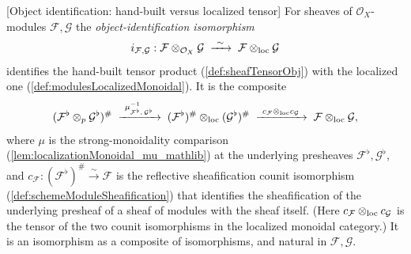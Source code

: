\begin{definition}



[Object identification: hand-built versus localized tensor]
  \label{def:tensorObjLocalizedIso}
  For sheaves of \(\mathcal{O}_X\)-modules \(\mathcal{F}, \mathcal{G}\) the
  \emph{object-identification isomorphism}
  \[
    i_{\mathcal{F},\mathcal{G}} :
      \mathcal{F} \otimes_{\mathcal{O}_X} \mathcal{G}
      \;\xrightarrow{\ \sim\ }\;
      \mathcal{F} \mathbin{\otimes_{\mathrm{loc}}} \mathcal{G}
  \]
  identifies the hand-built tensor product (\cref{def:sheafTensorObj}) with the
  localized one (\cref{def:modulesLocalizedMonoidal}). It is the composite
  \[
    (\mathcal{F}^{\flat} \otimes_p \mathcal{G}^{\flat})^{\#}
      \;\xrightarrow{\ \mu_{\mathcal{F}^{\flat},\,\mathcal{G}^{\flat}}^{-1}\ }\;
      (\mathcal{F}^{\flat})^{\#} \lotimes (\mathcal{G}^{\flat})^{\#}
      \;\xrightarrow{\ c_{\mathcal{F}} \lotimes c_{\mathcal{G}}\ }\;
      \mathcal{F} \lotimes \mathcal{G},
  \]
  where \(\mu\) is the strong-monoidality comparison
  (\cref{lem:localizationMonoidal_mu_mathlib}) at the underlying presheaves
  \(\mathcal{F}^{\flat}, \mathcal{G}^{\flat}\), and
  \(c_{\mathcal{F}} : (\mathcal{F}^{\flat})^{\#} \xrightarrow{\sim} \mathcal{F}\)
  is the reflective sheafification counit isomorphism
  (\cref{def:schemeModuleSheafification}) that identifies the sheafification of the
  underlying presheaf of a sheaf of modules with the sheaf itself. (Here
  \(c_{\mathcal{F}} \mathbin{\otimes_{\mathrm{loc}}} c_{\mathcal{G}}\) is the tensor of the two counit
  isomorphisms in the localized monoidal category.) It is an isomorphism as a
  composite of isomorphisms, and natural in \(\mathcal{F}, \mathcal{G}\).
\end{definition}

